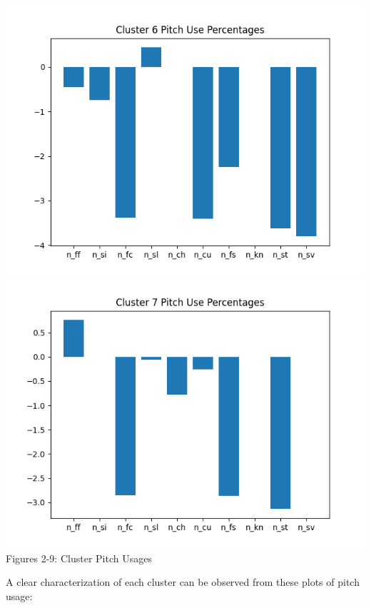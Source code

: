 \documentclass[12 pt]{article}
\begin{document}
\begin{center}
\\ \includegraphics[scale=.425]{figs/pct6_8.png} \includegraphics[scale=.425]{figs/pct7_8.png}
\\ Figures 2-9: Cluster Pitch Usages
\end{center}

\indent A clear characterization of each cluster can be observed from these plots of 
pitch usage: 
\end{document}
